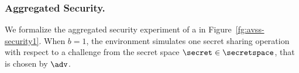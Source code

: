 \subsubsection{Aggregated Security.}

We formalize the aggregated security experiment of a \AVSS in Figure~\ref{fg:avss-security1}.
When $b=1$, the environment simulates one secret sharing operation with respect to a challenge from the secret space $\secret \in \secretspace$,
that is chosen by $\adv$.

\begin{figure}[!ht]
  \begin{pchstack}[boxed,center,space=1em]
\end{pchstack}
\end{figure}
